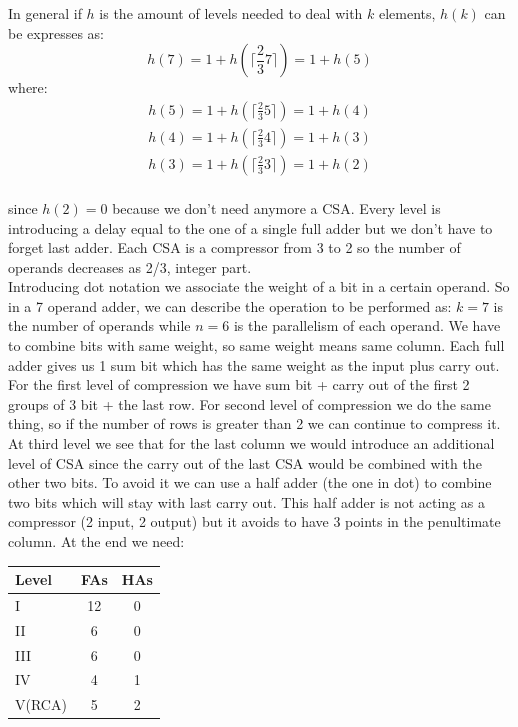 In general if $h$ is the amount of levels needed to deal with $k$ elements, $h(k)$ can be expresses as:
$$h(7)=1+h(\lceil \frac{2}{3}7 \rceil )=1+h(5)$$
where:
\begin{eqnarray}
h(5)=1+h(\lceil \frac{2}{3}5 \rceil )=1+h(4)\\
h(4)=1+h(\lceil \frac{2}{3}4 \rceil )=1+h(3)\\
h(3)=1+h(\lceil \frac{2}{3}3 \rceil )=1+h(2)\\
\end{eqnarray}

since $h(2)=0$ because we don't need anymore a CSA. Every level is introducing a delay equal to the one of a single full adder but we don't have to forget last adder.
Each CSA is a compressor from 3 to 2 so the number of operands decreases as 2/3, integer part.\\

Introducing dot notation we associate the weight of a bit in a certain operand. So in a 7 operand adder, we can describe the operation to be performed as:
$k=7$ is the number of operands while $n=6$ is the parallelism of each operand.
We have to combine bits with same weight, so same weight means same column. Each full adder gives us 1 sum bit which has the same weight as the input plus carry out. For the first level of compression we have sum bit + carry out of the first 2 groups of 3 bit + the last row.
For second level of compression we do the same thing, so if the number of rows is greater than 2 we can continue to compress it.
At third level we see that for the last column we would introduce an additional level of CSA since the carry out of the last CSA would be combined with the other two bits. To avoid it we can use a half adder (the one in dot) to combine two bits which will stay with last carry out. This half adder is not acting as a compressor (2 input, 2 output) but it avoids to have 3 points in the penultimate column. At the end we need:

\begin{center}
  \begin{tabular}{|l|c|c|}
    \hline
    Level&  FAs&  HAs\\
    \hline
    I&    12&   0\\
    II&   6&    0\\
    III&  6&    0\\
    IV&   4&    1\\
    V(RCA)& 5&    2\\
    \hline
  \end{tabular}
\end{center}

